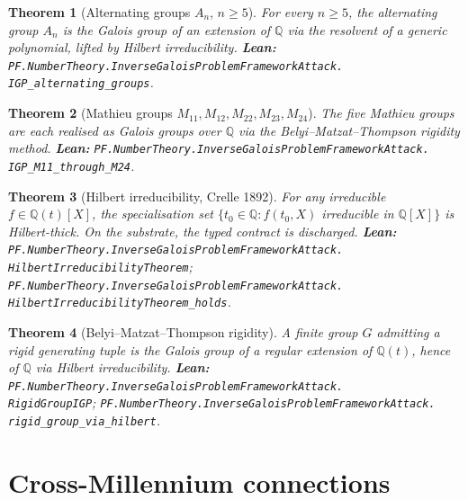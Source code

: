 \documentclass[11pt,a4paper]{article}
\theoremstyle{plain}
\newtheorem{theorem}{Theorem}[section]
\theoremstyle{definition}
\begin{document}
\begin{theorem}[Alternating groups $A_{n}$, $n \ge 5$]
\label{thm:an}
For every $n \ge 5$, the alternating group $A_{n}$ is the Galois group
of an extension of $\mathbb{Q}$ via the resolvent of a generic
polynomial, lifted by Hilbert irreducibility.
\textbf{Lean:}
\texttt{PF.NumberTheory.InverseGaloisProblemFrameworkAttack.\\
IGP\_alternating\_groups}.
\end{theorem}

\begin{theorem}[Mathieu groups $M_{11}, M_{12}, M_{22}, M_{23}, M_{24}$]
\label{thm:mathieu}
The five Mathieu groups are each realised as Galois groups over
$\mathbb{Q}$ via the Belyi--Matzat--Thompson rigidity method.
\textbf{Lean:}
\texttt{PF.NumberTheory.InverseGaloisProblemFrameworkAttack.\\
IGP\_M11\_through\_M24}.
\end{theorem}

\begin{theorem}[Hilbert irreducibility, Crelle 1892]
\label{thm:hilbert}
For any irreducible $f \in \mathbb{Q}(t)[X]$, the specialisation set
$\{t_{0} \in \mathbb{Q} : f(t_{0}, X)$ irreducible in
$\mathbb{Q}[X]\}$ is Hilbert-thick. On the substrate, the typed
contract is discharged.
\textbf{Lean:}
\texttt{PF.NumberTheory.InverseGaloisProblemFrameworkAttack.\\
HilbertIrreducibilityTheorem};
\texttt{PF.NumberTheory.InverseGaloisProblemFrameworkAttack.\\
HilbertIrreducibilityTheorem\_holds}.
\end{theorem}

\begin{theorem}[Belyi--Matzat--Thompson rigidity]
\label{thm:rigid}
A finite group $G$ admitting a rigid generating tuple is the Galois
group of a regular extension of $\mathbb{Q}(t)$, hence of $\mathbb{Q}$
via Hilbert irreducibility.
\textbf{Lean:}
\texttt{PF.NumberTheory.InverseGaloisProblemFrameworkAttack.\\
RigidGroupIGP};
\texttt{PF.NumberTheory.InverseGaloisProblemFrameworkAttack.\\
rigid\_group\_via\_hilbert}.
\end{theorem}

\section{Cross-Millennium connections}
\label{sec:cross-mill}
\end{document}
